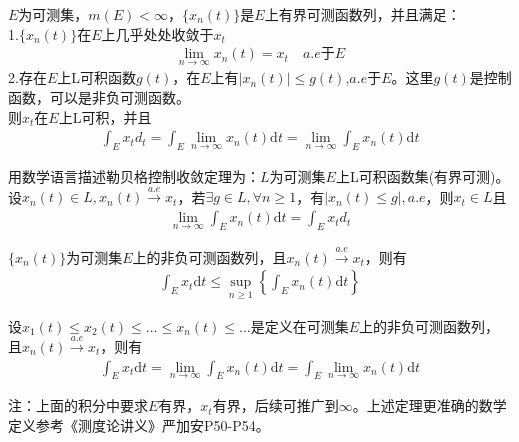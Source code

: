            \begin{theorem}[勒贝格控制收敛定理]
            $E$为可测集，$m(E)<\infty$，$\{x_n(t)\}$是$E$上有界可测函数列，并且满足：\\
            1.$\{x_n(t)\}$在$E$上几乎处处收敛于$x_t$
            \begin{align*}
                \lim_{n \rightarrow \infty} x_n(t) = x_t \quad a.e\text{于}E
            \end{align*}
            2.存在$E$上L可积函数$g(t)$，在$E$上有$|x_n(t) |\leqslant g(t)$,$a.e$于$E$。这里$g(t)$是控制函数，可以是非负可测函数。\\
            则$x_t$在$E$上L可积，并且
            \begin{align*}
                \int_E x_td_t = \int_E \lim_{n \rightarrow \infty}x_n(t) \mathrm{d}t = \lim_{n\rightarrow \infty} \int_Ex_n(t) \mathrm{d}t
            \end{align*}
            \end{theorem}
            \par
            用数学语言描述勒贝格控制收敛定理为：$L$为可测集$E$上L可积函数集(有界可测)。设$x_n(t)\in L,x_n(t)\xrightarrow{a.e}x_t$，若$\exists g\in L,\forall n \geqslant 1$，有$|x_n(t) \leqslant g|,a.e$，则$x_t\in L$且
            \begin{align*}
                \lim_{n\rightarrow \infty} \int_Ex_n(t) \mathrm{d}t = \int_E x_td_t
            \end{align*}
            \begin{lemma}[Fatou引理]
            $\{x_n(t)\}$为可测集$E$上的非负可测函数列，且$x_n(t)\xrightarrow{a.e}x_t$，则有
            \begin{align*}
                \int_E x_t \mathrm{d}t \leqslant \sup_{n \geqslant 1}\left\{ \int_E x_n(t) \mathrm{d}t\right\}
            \end{align*}
            \end{lemma}
            \begin{lemma}[Levi引理]
            设$x_1(t) \leqslant x_2(t) \leqslant \dots \leqslant x_n(t) \leqslant \dots$是定义在可测集$E$上的非负可测函数列，且$x_n(t)\xrightarrow{a.e}x_t$，则有
            \begin{align*}
            \int_E x_t \mathrm{d}t  = \lim_{n \rightarrow \infty} \int_E x_n(t) \mathrm{d}t = \int_E \lim_{n \rightarrow \infty} x_n(t) \mathrm{d}t
            \end{align*}
            \end{lemma}
            注：上面的积分中要求$E$有界，$x_t$有界，后续可推广到$\infty$。上述定理更准确的数学定义参考《测度论讲义》严加安P50-P54。

